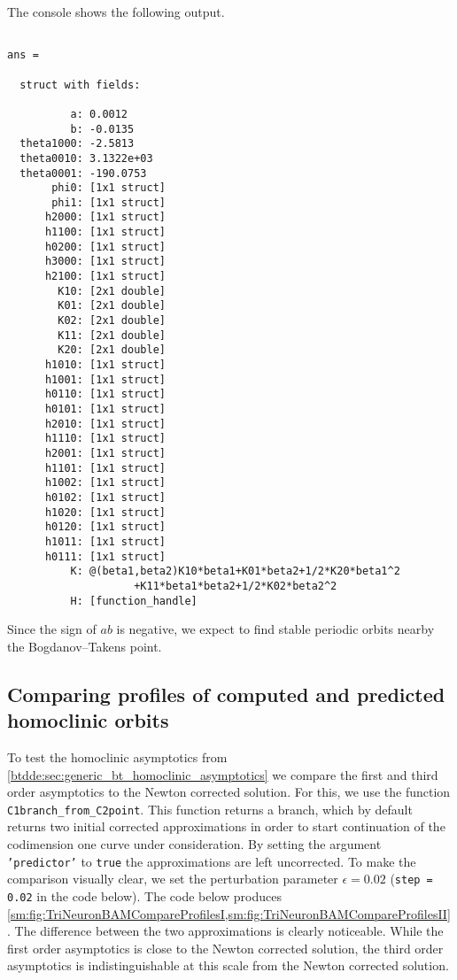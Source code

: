 The \MATLAB console shows the following output.
\begin{verbatim}

ans =

  struct with fields:

          a: 0.0012
          b: -0.0135
  theta1000: -2.5813
  theta0010: 3.1322e+03
  theta0001: -190.0753
       phi0: [1x1 struct]
       phi1: [1x1 struct]
      h2000: [1x1 struct]
      h1100: [1x1 struct]
      h0200: [1x1 struct]
      h3000: [1x1 struct]
      h2100: [1x1 struct]
        K10: [2x1 double]
        K01: [2x1 double]
        K02: [2x1 double]
        K11: [2x1 double]
        K20: [2x1 double]
      h1010: [1x1 struct]
      h1001: [1x1 struct]
      h0110: [1x1 struct]
      h0101: [1x1 struct]
      h2010: [1x1 struct]
      h1110: [1x1 struct]
      h2001: [1x1 struct]
      h1101: [1x1 struct]
      h1002: [1x1 struct]
      h0102: [1x1 struct]
      h1020: [1x1 struct]
      h0120: [1x1 struct]
      h1011: [1x1 struct]
      h0111: [1x1 struct]
          K: @(beta1,beta2)K10*beta1+K01*beta2+1/2*K20*beta1^2
                    +K11*beta1*beta2+1/2*K02*beta2^2
          H: [function_handle]

\end{verbatim}
Since the sign of $ab$ is negative, we expect to find stable periodic orbits nearby the 
Bogdanov--Takens point.

\subsection{Comparing profiles of computed and predicted homoclinic orbits}
To test the homoclinic asymptotics from
\cref{btdde:sec:generic_bt_homoclinic_asymptotics} we compare the first and third
order asymptotics to the Newton corrected solution. For this, we use the 
function \texttt{C1branch_from_C2point}. This function returns a branch, which
by default returns two initial corrected approximations in order to start continuation of the
codimension one curve under consideration. By setting the argument
\texttt{'predictor'} to \texttt{true} the approximations are left uncorrected.
To make the comparison visually clear, we set the perturbation parameter 
$\epsilon=0.02$ (\texttt{step = 0.02} in the code below).
The code below produces \cref{sm:fig:TriNeuronBAMCompareProfilesI,sm:fig:TriNeuronBAMCompareProfilesII}.
The difference between the two approximations is clearly noticeable. While
the first order asymptotics is close to the Newton corrected solution, the third
order asymptotics is indistinguishable at this scale from the Newton corrected
solution.
\inputminted[firstline=57, lastline=81]{MATLAB}{\pathToDDEBifToolDemos/BAM_neural_network_model/BAMnn.m}

